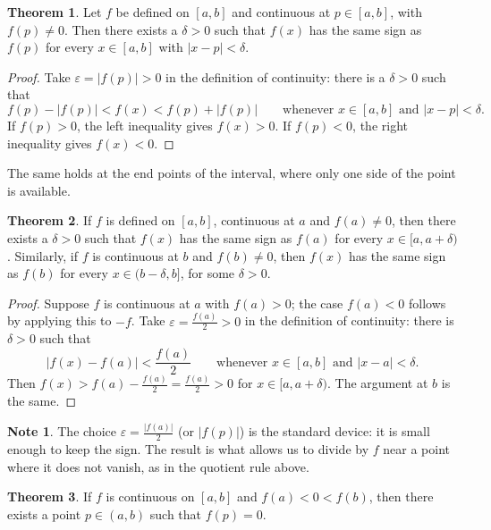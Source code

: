 \documentclass[11pt,a4paper]{article}
\numberwithin{equation}{section}
\theoremstyle{definition}
\newtheorem{thm}{Theorem}[subsection]
\newtheorem*{note}{Note}
\begin{document}
\begin{thm}\label{thm:signpres}
Let $f$ be defined on $[a,b]$ and continuous at $p\in [a,b]$, with $f(p)\neq 0$. Then there exists a $\delta > 0$ such that $f(x)$ has the same sign as $f(p)$ for every $x\in [a,b]$ with $|x - p| < \delta$.
\end{thm}

\begin{proof}
Take $\varepsilon = |f(p)|>0$ in the definition of continuity: there is a $\delta > 0$ such that
$$f(p) - |f(p)| < f(x) < f(p) + |f(p)| \qquad\text{whenever } x\in[a,b] \text{ and } |x - p| < \delta .$$
If $f(p) > 0$, the left inequality gives $f(x) > 0$. If $f(p) < 0$, the right inequality gives $f(x) < 0$.
\end{proof}

The same holds at the end points of the interval, where only one side of the point is available.


\begin{thm}
If $f$ is defined on $[a,b]$, continuous at $a$ and $f(a) \neq 0$, then there exists a $\delta > 0$ such that $f(x)$ has the same sign as $f(a)$ for every $x\in [a, a + \delta)$. Similarly, if $f$ is continuous at $b$ and $f(b) \neq 0$, then $f(x)$ has the same sign as $f(b)$ for every $x\in (b -\delta, b]$, for some $\delta>0$.
\end{thm}

\begin{proof}
Suppose $f$ is continuous at $a$ with $f(a)>0$; the case $f(a)<0$ follows by applying this to $-f$. Take $\varepsilon = \frac{f(a)}{2} > 0$ in the definition of continuity: there is $\delta>0$ such that
$$|f(x)-f(a)| < \frac{f(a)}{2} \qquad\text{whenever } x\in[a,b] \text{ and } |x-a|<\delta .$$
Then $f(x) > f(a) - \frac{f(a)}{2} = \frac{f(a)}{2} > 0$ for $x\in[a,a+\delta)$. The argument at $b$ is the same.
\end{proof}

\begin{note}
The choice $\varepsilon = \frac{|f(a)|}{2}$ (or $|f(p)|$) is the standard device: it is small enough to keep the sign. The result is what allows us to divide by $f$ near a point where it does not vanish, as in the quotient rule above.
\end{note}


\begin{thm}
If $f$ is continuous on $[a,b]$ and $f(a) < 0 < f(b)$, then there exists a point $p\in (a,b)$ such that $f(p) = 0$.
\end{thm}
\end{document}
